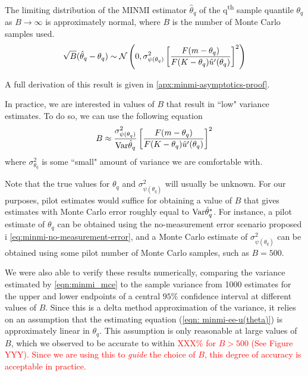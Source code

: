 \begin{theorem}\label{eqn:minmi_mce}
    The limiting distribution of the MINMI estimator $\hat\theta_q$ of the q\textsuperscript{th} sample quantile $\theta_q$ as $B \rightarrow \infty$ is approximately normal, where $B$ is the number of Monte Carlo samples used.
    $$\sqrt{B}(\hat\theta_q - \theta_q) \sim \mathcal{N} \left(0, \sigma^2_{\psi(\theta_q)} \left[ \frac{F(m-\theta_q)}{F(K-\theta_q)\hat{u}^\prime(\theta_q)} \right]^2 \right)$$
\end{theorem}
A full derivation of this result is given in \autoref{apx:minmi-asymptotics-proof}.

In practice, we are interested in values of $B$ that result in ``low" variance estimates. To do so, we can use the following equation \[
B \approx \frac{\sigma^2_{\psi(\theta_q)}}{\mathrm{Var}{\hat\theta_q}} \left[ \frac{F(m-\theta_q)}{F(K-\theta_q)\hat{u}^\prime(\theta_q)} \right]^2
\] where $\sigma^2_{\theta_q}$ is some ``small" amount of variance we are comfortable with.

Note that the true values for $\theta_q$ and $\sigma^2_{\psi(\theta_q)}$ will usually be unknown. For our purposes, pilot estimates would suffice for obtaining a value of $B$ that gives estimates with Monte Carlo error roughly equal to $\mathrm{Var} \hat\theta_q^*$. For instance, a pilot estimate of $\theta_q$ can be obtained using the no-measurement error scenario proposed i \autoref{eq:minmi-no-measurement-error}, and a Monte Carlo estimate of $\sigma^2_{\psi(\theta_q)}$ can be obtained using some pilot number of Monte Carlo samples, such as $B=500$.

We were also able to verify these results numerically, comparing the variance estimated by \autoref{eqn:minmi_mce} to the sample variance from 1000 estimates for the upper and lower endpoints of a central $95\%$ confidence interval at different values of $B$. Since this is a delta method approximation of the variance, it relies on an assumption that the estimating equation (\autoref{eqn: minmi-ee-u(theta)}) is approximately linear in $\theta_q$. This assumption is only reasonable at large values of $B$, which we observed to be accurate to within \textcolor{red}{XXX\% for $B > 500$ (See Figure YYY). Since we are using this to \textit{guide} the choice of $B$, this degree of accuracy is acceptable in practice.}

%     

